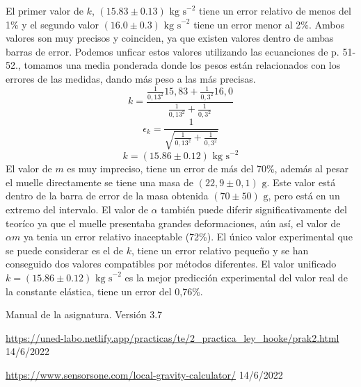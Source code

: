 \documentclass{article}
\begin{document}
\begin{multicols}{2}
El primer valor de $k$, $(15.83 \pm 0.13 ) \text{ kg s}^{-2}$ tiene un error relativo de menos del 1\% y el segundo valor $(16.0 \pm 0.3 ) \text{ kg s}^{-2}$ tiene un error menor al 2\%. Ambos valores son muy precisos y coinciden, ya que existen valores dentro de ambas barras de error. Podemos unficar estos valores utilizando las ecuanciones de \cite{manual} p. 51-52., tomamos una media ponderada donde los pesos están relacionados con los errores de las medidas, dando más peso a las más precisas.
$$
k = \frac{\frac{1}{0,13^2}15,83 + \frac{1}{0,3^2}16,0}{\frac{1}{0,13^2}+\frac{1}{0,3^2}}
$$
$$
\epsilon_k = \frac{1}{\sqrt{\frac{1}{0,13^2}+\frac{1}{0,3^2}}}
$$
$$
k = (15.86\pm 0.12) \text{ kg s}^{-2}
$$
El valor de $m$ es muy impreciso, tiene un error de más del 70\%, además al pesar el muelle directamente se tiene una masa de $(22,9 \pm 0,1) \text{ g}$. Este valor está dentro de la barra de error de la masa obtenida $(70 \pm 50) \text{ g}$, pero está en un extremo del intervalo. El valor de $\alpha$ también puede diferir significativamente del teoríco ya que el muelle presentaba grandes deformaciones, aún así, el valor de $\alpha m$ ya tenia un error relativo inaceptable (72\%). El único valor experimental que se puede considerar es el de $k$, tiene un error relativo pequeño y se han conseguido dos valores compatibles por métodos diferentes. El valor unificado $k = (15.86\pm 0.12) \text{ kg s}^{-2}$ es la mejor predicción experimental del valor real de la constante elástica, tiene un error del 0,76\%.
\begin{thebibliography}{1}

  Manual de la asignatura. Versión 3.7

  \url{https://uned-labo.netlify.app/practicas/te/2_practica_ley_hooke/prak2.html} 14/6/2022

  \url{https://www.sensorsone.com/local-gravity-calculator/} 14/6/2022

\end{thebibliography}
\end{multicols}
\end{document}

